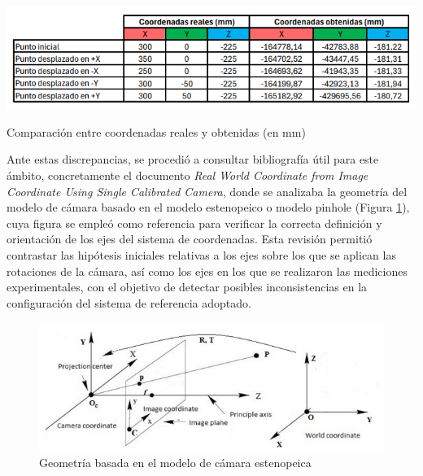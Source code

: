   \begin{table}[H]
     \centering
     \begin{center}
       \includegraphics[width=140mm]{figs/Primer resultados postit.png}
     \end{center}
     \caption{Comparación entre coordenadas reales y obtenidas (en mm)}
    \label{tab:primera_estimacion_postit}
  \end{table}

Ante estas discrepancias, se procedió a consultar bibliografía útil para este ámbito, concretamente el documento \textit{Real World Coordinate from Image Coordinate Using Single Calibrated Camera}\cite{Joko13}, donde se analizaba la geometría del modelo de cámara basado en el modelo estenopeico o modelo pinhole (Figura \ref{fig:geometria_modelopinhole}), cuya figura se empleó como referencia para verificar la correcta definición y orientación de los ejes del sistema de coordenadas. Esta revisión permitió contrastar las hipótesis iniciales relativas a los ejes sobre los que se aplican las rotaciones de la cámara, así como los ejes en los que se realizaron las mediciones experimentales, con el objetivo de detectar posibles inconsistencias en la configuración del sistema de referencia adoptado.

  \begin{figure}[H]
     \centering
     \begin{center}
       \includegraphics[width=135mm]{figs/Geometría del modelo de cámara basado en el modelo de cámara estenopeica.jpeg}
     \end{center}
     \caption{Geometría basada en el modelo de cámara estenopeica}
    \label{fig:geometria_modelopinhole}
  \end{figure}

